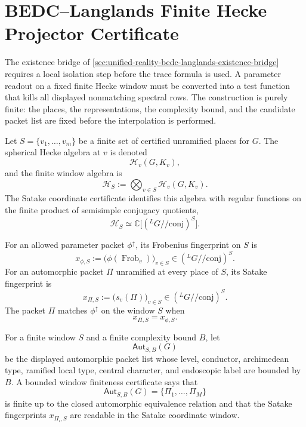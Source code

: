 \section{BEDC--Langlands Finite Hecke Projector Certificate}
\label{sec:unified-reality-bedc-langlands-finite-hecke-projector-cert}

The existence bridge of
\autoref{sec:unified-reality-bedc-langlands-existence-bridge} requires
a local isolation step before the trace formula is used. A parameter
readout on a fixed finite Hecke window must be converted into a test
function that kills all displayed nonmatching spectral rows. The
construction is purely finite: the places, the representations, the
complexity bound, and the candidate packet list are fixed before the
interpolation is performed.

\begin{definition}
\label{def:unified-reality-satake-coordinate-window}
Let $S=\{v_1,\ldots,v_m\}$ be a finite set of certified unramified
places for $G$. The spherical Hecke algebra at $v$ is denoted
$$
\mathcal H_v(G,K_v),
$$
and the finite window algebra is
$$
\mathcal H_S
:=
\bigotimes_{v\in S}\mathcal H_v(G,K_v).
$$
The Satake coordinate certificate identifies this algebra with regular
functions on the finite product of semisimple conjugacy quotients,
$$
\mathcal H_S
\simeq
\mathbb C\bigl[({}^LG/\!/\mathrm{conj})^S\bigr].
$$
\end{definition}

\begin{definition}
\label{def:unified-reality-frobenius-satake-fingerprint}
For an allowed parameter packet $\phi^{\uparrow}$, its Frobenius
fingerprint on $S$ is
$$
x_{\phi,S}
:=
\bigl(\phi(\operatorname{Frob}_v)\bigr)_{v\in S}
\in
({}^LG/\!/\mathrm{conj})^S.
$$
For an automorphic packet $\Pi$ unramified at every place of $S$, its
Satake fingerprint is
$$
x_{\Pi,S}
:=
\bigl(s_v(\Pi)\bigr)_{v\in S}
\in
({}^LG/\!/\mathrm{conj})^S.
$$
The packet $\Pi$ matches $\phi^{\uparrow}$ on the window $S$ when
$$
x_{\Pi,S}=x_{\phi,S}.
$$
\end{definition}

\begin{definition}
\label{def:unified-reality-bounded-window-candidate-packet}
For a finite window $S$ and a finite complexity bound $B$, let
$$
\mathsf{Aut}_{S,B}(G)
$$
be the displayed automorphic packet list whose level, conductor,
archimedean type, ramified local type, central character, and
endoscopic label are bounded by $B$. A bounded window finiteness
certificate says that
$$
\mathsf{Aut}_{S,B}(G)=\{\Pi_1,\ldots,\Pi_M\}
$$
is finite up to the closed automorphic equivalence relation and that
the Satake fingerprints $x_{\Pi_i,S}$ are readable in the Satake
coordinate window.
\end{definition}

